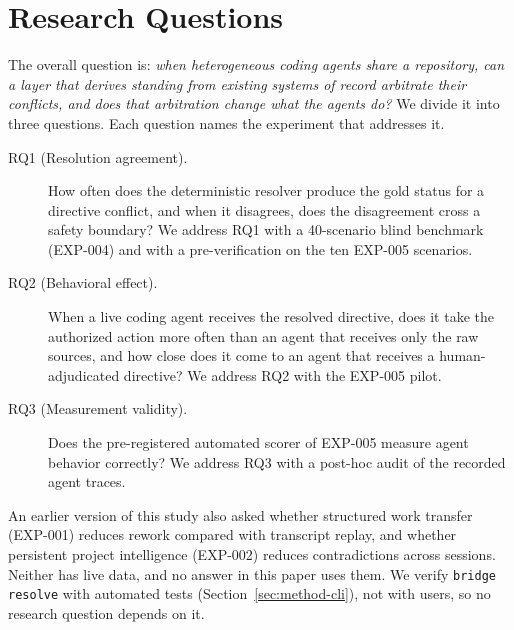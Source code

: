 \section{Research Questions}
\label{sec:rqs}

The overall question is: \emph{when heterogeneous coding agents share a repository, can a layer that derives standing from existing systems of record arbitrate their conflicts, and does that arbitration change what the agents do?} We divide it into three questions. Each question names the experiment that addresses it.

\begin{description}
    \item[RQ1 (Resolution agreement).] How often does the deterministic resolver produce the gold status for a directive conflict, and when it disagrees, does the disagreement cross a safety boundary? We address RQ1 with a 40-scenario blind benchmark (EXP-004) and with a pre-verification on the ten EXP-005 scenarios.
    \item[RQ2 (Behavioral effect).] When a live coding agent receives the resolved directive, does it take the authorized action more often than an agent that receives only the raw sources, and how close does it come to an agent that receives a human-adjudicated directive? We address RQ2 with the EXP-005 pilot.
    \item[RQ3 (Measurement validity).] Does the pre-registered automated scorer of EXP-005 measure agent behavior correctly? We address RQ3 with a post-hoc audit of the recorded agent traces.
\end{description}

An earlier version of this study also asked whether structured work transfer (EXP-001) reduces rework compared with transcript replay, and whether persistent project intelligence (EXP-002) reduces contradictions across sessions. Neither has live data, and no answer in this paper uses them. We verify \texttt{bridge resolve} with automated tests (Section~\ref{sec:method-cli}), not with users, so no research question depends on it.

